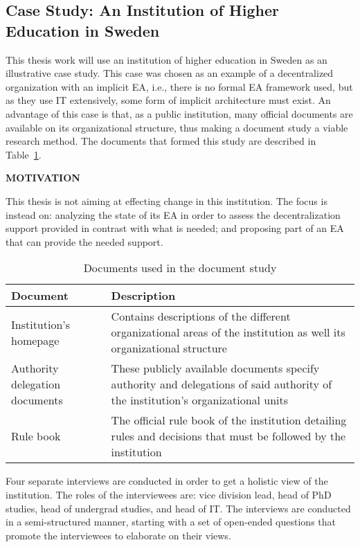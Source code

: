 \subsection{Case Study: An Institution of Higher Education in Sweden}
\label{sec:case}

This thesis work will use an institution of higher education in Sweden as an illustrative case study. This case was chosen as an example of a decentralized organization with an implicit EA, i.e., there is no formal EA framework used, but as they use IT extensively, some form of implicit architecture must exist. An advantage of this case is that, as a public institution, many official documents are available on its organizational structure, thus making a document study a viable research method. The documents that formed this study are described in Table~\ref{tab:doc_study}.

\textbf{MOTIVATION}

This thesis is not aiming at effecting change in this institution. The focus is instead on: analyzing the state of its EA in order to assess the decentralization support provided in contrast with what is needed; and proposing part of an EA that can provide the needed support. 

\begin{table}  
  \begin{tabular}[c]{| p{} |
                       p{} | }
    \hline
    \textbf{Document} & \textbf{Description} \\
    \hline
    Institution's homepage & Contains descriptions of the different organizational areas of the institution as well its organizational structure \\
    \hline
    Authority delegation documents & These publicly available documents specify authority and delegations of said authority of the institution's organizational units \\
    \hline
    Rule book & The official rule book of the institution detailing rules and decisions that must be followed by the institution \\
    \hline
  \end{tabular}
  \caption{Documents used in the document study}
  \label{tab:doc_study}
\end{table}

Four separate interviews are conducted in order to get a holistic view of the institution. The roles of the interviewees are: vice division lead, head of PhD studies, head of undergrad studies, and head of IT. The interviews are conducted in a semi-structured manner, starting with a set of open-ended questions that promote the interviewees to elaborate on their views. 

